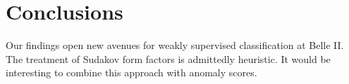 \section{Conclusions}\label{sec:conclusions}

Our findings open new avenues for weakly supervised classification at
Belle II. The treatment of Sudakov form factors is admittedly heuristic.
It would be interesting to combine this approach with anomaly scores.


